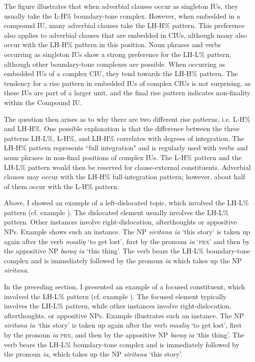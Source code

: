 \newpage
The figure illustrates that when adverbial clauses occur as singleton IUs, they usually take the L-H\% boundary-tone complex. However, when embedded in a compound IU, many adverbial clauses take the LH-H\% pattern. This preference also applies to adverbial clauses that are embedded in CIUs, although many also occur with the LH-H\% pattern in this position. Noun phrases and verbs occurring as singleton IUs show a strong preference for the LH-L\% pattern, although other boundary-tone complexes are possible. When occurring as embedded IUs of a complex CIU, they tend towards the LH-H\% pattern. The tendency for a rise pattern in embedded IUs of complex CIUs is not surprising, as these IUs are part of a larger unit, and the final rise pattern indicates non-finality within the Compound IU.

The question then arises as to why there are two different rise patterns, i.e. L-H\% and LH-H\%. One possible explanation is that the difference between the three patterns LH-L\%, L-H\%, and LH-H\% correlates with degrees of integration. The LH-H\% pattern represents ``full integration" and is regularly used with verbs and noun phrases in non-final positions of complex IUs. The L-H\% pattern and the LH-L\% pattern would then be reserved for clause-external constituents. Adverbial clauses may occur with the LH-H\% full-integration pattern; however, about half of them occur with the L-H\% pattern.



Above, I showed an example of a left-dislocated topic, which involved the LH-L\% pattern (cf. example ). The dislocated element usually involves the LH-L\% pattern. Other instances involve right-dislocation, afterthoughts or appositive NPs. Example  shows such an instance. The NP \textit{siritana ia} ‘this story’ is taken up again after the verb \textit{maaliŋ} ‘to get lost’, first by the pronoun \textit{ia} `\textsc{prx}' and then by the appositive NP \textit{baraŋ ia} ‘this thing’. The verb bears the LH-L\% boundary-tone complex and is immediately followed by the pronoun \textit{ia} which takes up the NP \textit{siritana}.

In the preceding section, I presented an example of a focused constituent, which involved the LH-L\% pattern (cf. example ). The focused element typically involves the LH-L\% pattern, while other instances involve right-dislocation, afterthoughts, or appositive NPs. Example  illustrates such an instance. The NP \textit{siritana ia} `this story' is taken up again after the verb \textit{maaliŋ} `to get lost', first by the pronoun \textit{ia} \textsc{prx}, and then by the appositive NP \textit{baraŋ ia} `this thing'. The verb bears the LH-L\% boundary-tone complex and is immediately followed by the pronoun \textit{ia}, which takes up the NP \textit{siritana} `this story'.


